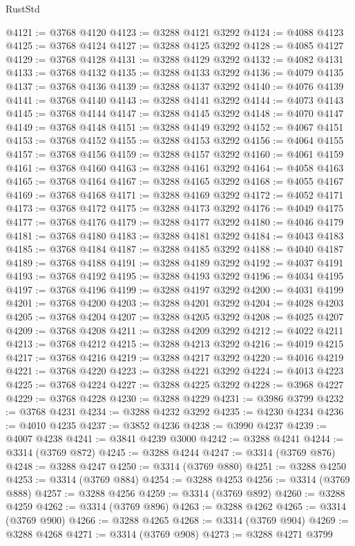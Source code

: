 \begin{lexlean}{RustStd}
\begin{coremodule}
@4121 := @3768 @4120
@4123 := @3288 @4121 @3292
@4124 := @4088 @4123
@4125 := @3768 @4124
@4127 := @3288 @4125 @3292
@4128 := @4085 @4127
@4129 := @3768 @4128
@4131 := @3288 @4129 @3292
@4132 := @4082 @4131
@4133 := @3768 @4132
@4135 := @3288 @4133 @3292
@4136 := @4079 @4135
@4137 := @3768 @4136
@4139 := @3288 @4137 @3292
@4140 := @4076 @4139
@4141 := @3768 @4140
@4143 := @3288 @4141 @3292
@4144 := @4073 @4143
@4145 := @3768 @4144
@4147 := @3288 @4145 @3292
@4148 := @4070 @4147
@4149 := @3768 @4148
@4151 := @3288 @4149 @3292
@4152 := @4067 @4151
@4153 := @3768 @4152
@4155 := @3288 @4153 @3292
@4156 := @4064 @4155
@4157 := @3768 @4156
@4159 := @3288 @4157 @3292
@4160 := @4061 @4159
@4161 := @3768 @4160
@4163 := @3288 @4161 @3292
@4164 := @4058 @4163
@4165 := @3768 @4164
@4167 := @3288 @4165 @3292
@4168 := @4055 @4167
@4169 := @3768 @4168
@4171 := @3288 @4169 @3292
@4172 := @4052 @4171
@4173 := @3768 @4172
@4175 := @3288 @4173 @3292
@4176 := @4049 @4175
@4177 := @3768 @4176
@4179 := @3288 @4177 @3292
@4180 := @4046 @4179
@4181 := @3768 @4180
@4183 := @3288 @4181 @3292
@4184 := @4043 @4183
@4185 := @3768 @4184
@4187 := @3288 @4185 @3292
@4188 := @4040 @4187
@4189 := @3768 @4188
@4191 := @3288 @4189 @3292
@4192 := @4037 @4191
@4193 := @3768 @4192
@4195 := @3288 @4193 @3292
@4196 := @4034 @4195
@4197 := @3768 @4196
@4199 := @3288 @4197 @3292
@4200 := @4031 @4199
@4201 := @3768 @4200
@4203 := @3288 @4201 @3292
@4204 := @4028 @4203
@4205 := @3768 @4204
@4207 := @3288 @4205 @3292
@4208 := @4025 @4207
@4209 := @3768 @4208
@4211 := @3288 @4209 @3292
@4212 := @4022 @4211
@4213 := @3768 @4212
@4215 := @3288 @4213 @3292
@4216 := @4019 @4215
@4217 := @3768 @4216
@4219 := @3288 @4217 @3292
@4220 := @4016 @4219
@4221 := @3768 @4220
@4223 := @3288 @4221 @3292
@4224 := @4013 @4223
@4225 := @3768 @4224
@4227 := @3288 @4225 @3292
@4228 := @3968 @4227
@4229 := @3768 @4228
@4230 := @3288 @4229
@4231 := @3986 @3799
@4232 := @3768 @4231
@4234 := @3288 @4232 @3292
@4235 := @4230 @4234
@4236 := @4010 @4235
@4237 := @3852 @4236
@4238 := @3990 @4237
@4239 := @4007 @4238
@4241 := @3841 @4239 @3000
@4242 := @3288 @4241
@4244 := @3314 (@3769 @872)
@4245 := @3288 @4244
@4247 := @3314 (@3769 @876)
@4248 := @3288 @4247
@4250 := @3314 (@3769 @880)
@4251 := @3288 @4250
@4253 := @3314 (@3769 @884)
@4254 := @3288 @4253
@4256 := @3314 (@3769 @888)
@4257 := @3288 @4256
@4259 := @3314 (@3769 @892)
@4260 := @3288 @4259
@4262 := @3314 (@3769 @896)
@4263 := @3288 @4262
@4265 := @3314 (@3769 @900)
@4266 := @3288 @4265
@4268 := @3314 (@3769 @904)
@4269 := @3288 @4268
@4271 := @3314 (@3769 @908)
@4273 := @3288 @4271 @3799

\end{coremodule}
\end{lexlean}
